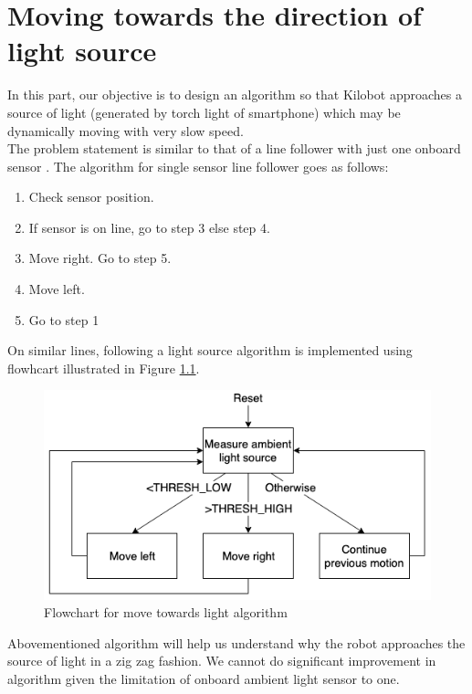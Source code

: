 \chapter{Moving towards the direction of light source}
In this part, our objective is to design an algorithm so that Kilobot approaches a source of light (generated by torch light of smartphone) which may be dynamically moving with very slow speed.\\
The problem statement is similar to that of a line follower with just one onboard sensor \cite{simple-line-follower}. The algorithm for single sensor line follower goes as follows:
\begin{enumerate}
	\item Check sensor position.
	\item If sensor is on line, go to step 3 else step 4.
	\item Move right. Go to step 5.
	\item Move left.
	\item Go to step 1
\end{enumerate}
On similar lines, following a light source algorithm is implemented using flowhcart illustrated in Figure \ref{fig:move_towards_light_algorithm}.
\begin{figure}[H]
	\centering
	\includegraphics[scale=0.6]{images/move_towards_light_algorithm}
	\caption{Flowchart for move towards light algorithm}
	\label{fig:move_towards_light_algorithm}
\end{figure}
Abovementioned algorithm will help us understand why the robot approaches the source of light in a zig zag fashion. We cannot do significant improvement in algorithm given the limitation of onboard ambient light sensor to one.
